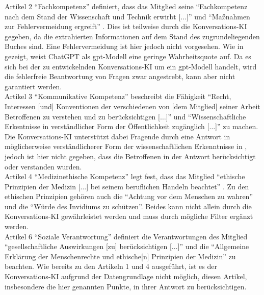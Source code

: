 Artikel 2 \enquote{Fachkompetenz} definiert, dass das Mitglied seine \enquote{Fachkompetenz nach dem Stand der Wissenschaft und Technik erwirbt [$\dots$]} und \enquote{Maßnahmen zur Fehlervermeidung ergreift} \citep{gmds_eth}. 
Dies ist teilweise durch die Konversations-KI gegeben, da die extrahierten Informationen auf dem Stand des zugrundeliegenden Buches \citet{bb} sind. 
Eine Fehlervermeidung ist hier jedoch nicht vorgesehen. 
Wie in \citet{chatgpt_qas} gezeigt, weist ChatGPT als \ac{gpt}-Modell eine geringe Wahrheitsquote auf. 
Da es sich bei der zu entwickelnden Konversations-KI um ein \ac{gpt}-Modell handelt, wird die fehlerfreie Beantwortung von Fragen zwar angestrebt, kann aber nicht garantiert werden.\\

Artikel 3 \enquote{Kommunikative Kompetenz} beschreibt die Fähigkeit 
\enquote{Recht, Interessen [und] Konventionen der verschiedenen von [dem Mitglied] seiner Arbeit Betroffenen zu verstehen und zu berücksichtigen [$\dots$]} und
\enquote{Wissenschaftliche Erkentnisse in verständlicher Form der Öffentlichkeit zugänglich [$\dots$]} \citep{gmds_eth} zu machen.
Die Konversations-KI unterstützt dabei Fragende durch eine Antwort in möglicherweise verständlicherer Form der wissenschaftlichen Erkenntnisse in \citet{bb}, 
jedoch ist hier nicht gegeben, dass die Betroffenen in der Antwort berücksichtigt oder verstanden wurden.\\

Artikel 4 \enquote{Medizinethische Kompetenz} legt fest, dass das Mitglied 
\enquote{ethische Prinzipien der Medizin [$\dots$] bei seinem beruflichen Handeln beachtet} \citep{gmds_eth}.
Zu den ethischen Prinzipien \citep{gmds_eth} gehören auch die \enquote{Achtung vor dem Menschen zu wahren} und die \enquote{Würde des Invidiums zu schützen}.
Beides kann nicht allein durch die Konversations-KI gewährleistet werden und muss durch mögliche Filter ergänzt werden.\\

Artikel 6 \enquote{Soziale Verantwortung} definiert die Verantwortungen des Mitglied 
\enquote{gesellschaftliche Auswirkungen [zu] berücksichtigen [$\dots$]} und die 
\enquote{Allgemeine Erklärung der Menschenrechte und ethische[n] Prinzipien der Medizin} \citep{gmds_eth}zu beachten. 
Wie bereits zu den Artikeln 1 und 4 ausgeführt, ist es der Konversations-KI aufgrund der Datengrundlage nicht möglich, diesen Artikel, insbesondere die hier genannten Punkte, in ihrer Antwort zu berücksichtigen.\\

